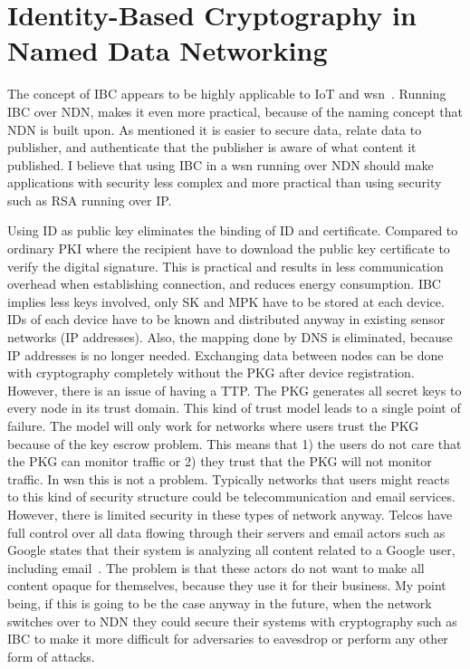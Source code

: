 \section{Identity-Based Cryptography in Named Data Networking}
The concept of \gls{IBC} appears to be highly applicable to \gls{IoT} and \gls{wsn}~\cite{Patil:2012:SWS:2464778}.
Running \gls{IBC} over \gls{NDN}, makes it even more practical, because of the naming concept that \gls{NDN} is built upon. 
As mentioned it is easier to secure data, relate data to publisher, and authenticate that the publisher is aware of what content it published. 
I believe that using \gls{IBC} in a \gls{wsn} running over \gls{NDN} should make applications with security less complex and more practical than using security such as RSA running over \gls{IP}. 

Using \gls{ID} as public key eliminates the binding of ID and certificate. 
Compared to ordinary \gls{PKI} where the recipient have to download the public key certificate to verify the digital signature.
This is practical and results in less communication overhead when establishing connection, and reduces energy consumption.
\gls{IBC} implies less keys involved, only \gls{SK} and \gls{MPK} have to be stored at each device. 
\gls{ID}s of each device have to be known and distributed anyway in existing sensor networks (IP addresses).
Also, the mapping done by \gls{DNS} is eliminated, because IP addresses is no longer needed.
Exchanging data between nodes can be done with cryptography completely without the \gls{PKG} after device registration.
However, there is an issue of having a \gls{TTP}.
The \gls{PKG} generates all secret keys to every node in its trust domain. 
This kind of trust model leads to a single point of failure.
The model will only work for networks where users trust the \gls{PKG} because of the key escrow problem.
This means that 1) the users do not care that the \gls{PKG} can monitor traffic or 2) they trust that the \gls{PKG} will not monitor traffic.
In \gls{wsn} this is not a problem.
Typically networks that users might reacts to this kind of security structure could be telecommunication and email services. 
However, there is limited security in these types of network anyway. 
Telcos have full control over all data flowing through their servers and email actors such as Google states that their system is analyzing all content related to a Google user, including email~\cite{google_reads_email}.
The problem is that these actors do not want to make all content opaque for themselves, because they use it for their business. 
My point being, if this is going to be the case anyway in the future, when the network switches over to \gls{NDN} they could secure their systems with cryptography such as \gls{IBC} to make it more difficult for adversaries to eavesdrop or perform any other form of attacks.


